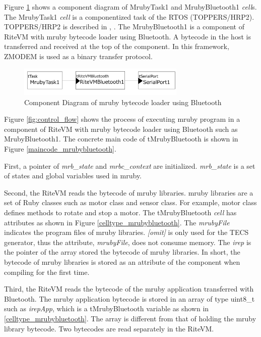 \documentclass[conference,compsoc]{IEEEtran}
\begin{document}
Figure \ref{fig:component_bluetooth} shows a component diagram of MrubyTask1 and MrubyBluetooth1 {\it cell}s.
The MrubyTask1 {\it cell} is a componentized task of the RTOS (TOPPERS/HRP2).
TOPPERS/HRP2 is described in \cite{url:HRP2}, \cite{par:hr-tecs}.
The MrubyBluetooth1 is a component of RiteVM with mruby bytecode loader using Bluetooth.
A bytecode in the host is transferred and received at the top of the component.
In this framework, ZMODEM \cite{par:zmodem} is used as a binary transfer protocol.

\begin{figure}[t]
    \centering
    \includegraphics[width=8cm,clip]{figure/component_bluetooth.pdf}
    \caption{Component Diagram of mruby bytecode loader using Bluetooth}
    \label{fig:component_bluetooth}
\end{figure}

Figure \ref{fig:control_flow} shows the process of executing mruby program in a component of RiteVM with mruby bytecode loader using Bluetooth such as MrubyBluetooth1.
The concrete main code of tMrubyBluetooth is shown in Figure \ref{maincode_mrubybluetooth}.

First, a pointer of {\it mrb\_state} and {\it mrbc\_context} are initialized.
{\it mrb\_state} is a set of states and global variables used in mruby.

Second, the RiteVM reads the bytecode of mruby libraries.
mruby libraries are a set of Ruby classes such as motor class and sensor class.
For example, motor class defines methods to rotate and stop a motor.
The tMrubyBluetooth {\it cell} has attributes as shown in Figure \ref{celltype_mrubybluetooth}.
The {\it mrubyFile} indicates the program files of mruby libraries.
{\it [omit]} is only used for the TECS generator, thus the attribute, {\it mrubyFile}, does not consume memory.
The {\it irep} is the pointer of the array stored the bytecode of mruby libraries.
In short, the bytecode of mruby libraries is stored as an attribute of the component when compiling for the first time.

Third, the RiteVM reads the bytecode of the mruby application transferred with Bluetooth.
The mruby application bytecode is stored in an array of type uint8\_t such as {\it irepApp}, which is a tMrubyBluetooth variable as shown in \ref{celltype_mrubybluetooth}.
The array is different from that of holding the mruby library bytecode.
Two bytecodes are read separately in the RiteVM.
\end{document}
